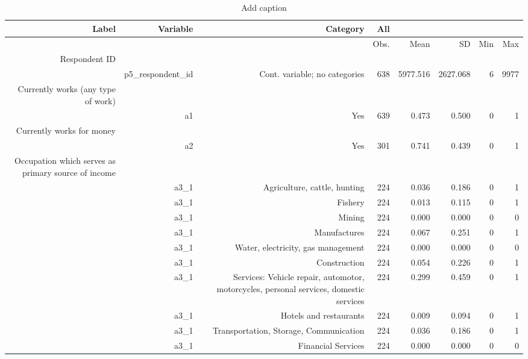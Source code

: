 \begin{table}[htbp]
  \centering
  \caption{Add caption}
    \begin{tabular}{rrrrrrrr}
    \toprule
    \textbf{Label} & \textbf{Variable} & \textbf{Category} & \textbf{All} & \textbf{} & \textbf{} & \textbf{} & \textbf{} \\
    \midrule
          &       &       & Obs.  & Mean  & SD    & Min   & Max \\
    Respondent ID &       &       &       &       &       &       &  \\
          & p5\_respondent\_id & Cont. variable; no categories & 638   & 5977.516 & 2627.068 & 6     & 9977 \\
    Currently works (any type of work) &       &       &       &       &       &       &  \\
          & a1    & Yes   & 639   & 0.473 & 0.500 & 0     & 1 \\
    Currently works for money &       &       &       &       &       &       &  \\
          & a2    & Yes   & 301   & 0.741 & 0.439 & 0     & 1 \\
    Occupation which serves as primary source of income &       &       &       &       &       &       &  \\
          & a3\_1 & Agriculture, cattle, hunting & 224   & 0.036 & 0.186 & 0     & 1 \\
          & a3\_1 & Fishery & 224   & 0.013 & 0.115 & 0     & 1 \\
          & a3\_1 & Mining & 224   & 0.000 & 0.000 & 0     & 0 \\
          & a3\_1 & Manufactures & 224   & 0.067 & 0.251 & 0     & 1 \\
          & a3\_1 & Water, electricity, gas management & 224   & 0.000 & 0.000 & 0     & 0 \\
          & a3\_1 & Construction & 224   & 0.054 & 0.226 & 0     & 1 \\
          & a3\_1 & Services: Vehicle repair, automotor, motorcycles, personal services, domestic services & 224   & 0.299 & 0.459 & 0     & 1 \\
          & a3\_1 & Hotels and restaurants & 224   & 0.009 & 0.094 & 0     & 1 \\
          & a3\_1 & Transportation, Storage, Communication & 224   & 0.036 & 0.186 & 0     & 1 \\
          & a3\_1 & Financial Services & 224   & 0.000 & 0.000 & 0     & 0 \\

\end{tabular}
\end{table}
